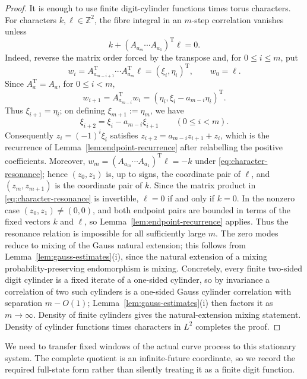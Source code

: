 \documentclass[11pt,a4paper]{amsart}
\theoremstyle{definition}
\theoremstyle{remark}
\newcommand{\Z}{\mathbb Z}
\begin{document}
\begin{proof}
It is enough to use finite digit-cylinder functions times torus characters.
For characters $k,\ell\in\Z^2$, the fibre integral in an $m$-step
correlation vanishes unless
\begin{equation}\label{eq:character-resonance}
 k+(A_{a_m}\cdots A_{a_1})^{\mathrm T}\ell=0.
\end{equation}
Indeed, reverse the matrix order forced by the transpose and, for
$0\le i\le m$, put
\[
 w_i=A_{a_{m-i+1}}^{\mathrm T}\cdots A_{a_m}^{\mathrm T}\ell
     =(\xi_i,\eta_i)^{\mathrm T},
 \qquad w_0=\ell.
\]
Since $A_a^{\mathrm T}=A_a$, for $0\le i<m$,
\[
 w_{i+1}=A_{a_{m-i}}^{\mathrm T}w_i
          =(\eta_i,\xi_i-a_{m-i}\eta_i)^{\mathrm T}.
\]
Thus $\xi_{i+1}=\eta_i$; on defining $\xi_{m+1}:=\eta_m$, we have
\[
 \xi_{i+2}=\xi_i-a_{m-i}\xi_{i+1}
 \qquad(0\le i<m).
\]
Consequently $z_i=(-1)^i\xi_i$ satisfies
$z_{i+2}=a_{m-i}z_{i+1}+z_i$, which is the recurrence of
Lemma~\ref{lem:endpoint-recurrence} after relabelling the positive
coefficients.  Moreover,
$w_m=(A_{a_m}\cdots A_{a_1})^{\mathrm T}\ell=-k$ under
\eqref{eq:character-resonance}; hence $(z_0,z_1)$ is, up to signs, the
coordinate pair of $\ell$, and $(z_m,z_{m+1})$ is the coordinate pair of
$k$.  Since the matrix product in \eqref{eq:character-resonance} is
invertible, $\ell=0$ if and only if $k=0$.  In the nonzero case
$(z_0,z_1)\ne(0,0)$, and both endpoint pairs are bounded in terms of the
fixed vectors $k$ and $\ell$, so Lemma~\ref{lem:endpoint-recurrence} applies.
Thus the resonance relation is impossible for all sufficiently large $m$.
The zero modes reduce to mixing of the Gauss natural extension; this follows
from Lemma~\ref{lem:gauss-estimates}(i), since the natural extension of a
mixing probability-preserving endomorphism is mixing.  Concretely, every
finite two-sided digit cylinder is a fixed iterate of a one-sided cylinder,
so by invariance a correlation of two such cylinders is a one-sided Gauss
cylinder correlation with separation $m-O(1)$; Lemma~\ref{lem:gauss-estimates}(i)
then factors it as $m\to\infty$.  Density of finite cylinders gives the
natural-extension mixing statement.
Density of cylinder functions times characters in $L^2$ completes the proof.
\end{proof}

We need to transfer fixed windows of the actual curve process to this
stationary system.  The complete quotient is an infinite-future coordinate,
so we record the required full-state form rather than silently treating it as
a finite digit function.
\end{document}
